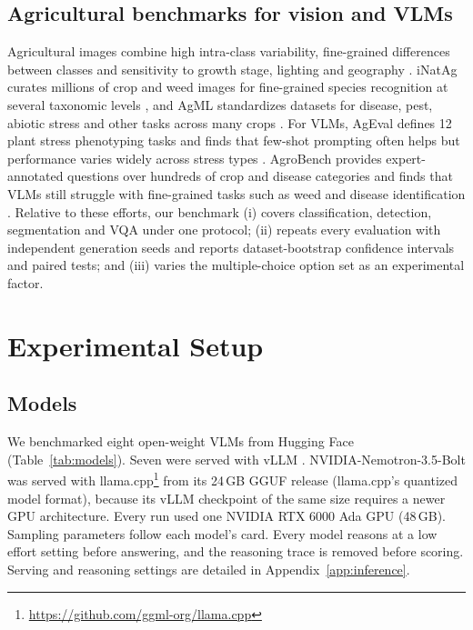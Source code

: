 \documentclass[10pt,letterpaper]{article}
\begin{document}
\subsection{Agricultural benchmarks for vision and VLMs}
\label{sec:background_ag_benchmarks}
Agricultural images combine high intra-class variability, fine-grained differences between classes and sensitivity to growth stage, lighting and geography \cite{min_computer_2025, upadhyay_deep_2025}. iNatAg curates millions of crop and weed images for fine-grained species recognition at several taxonomic levels \cite{jain_inatag_nodate}, and AgML standardizes datasets for disease, pest, abiotic stress and other tasks across many crops \cite{joshi_standardizing_2023}. For VLMs, AgEval defines 12 plant stress phenotyping tasks and finds that few-shot prompting often helps but performance varies widely across stress types \cite{arshad_leveraging_2025}. AgroBench provides expert-annotated questions over hundreds of crop and disease categories and finds that VLMs still struggle with fine-grained tasks such as weed and disease identification \cite{shinoda_agrobench_2025}. Relative to these efforts, our benchmark (i) covers classification, detection, segmentation and VQA under one protocol; (ii) repeats every evaluation with independent generation seeds and reports dataset-bootstrap confidence intervals and paired tests; and (iii) varies the multiple-choice option set as an experimental factor.

\section{Experimental Setup}
\label{sec:experiment}

\subsection{Models}
\label{sec:models}

We benchmarked eight open-weight VLMs from Hugging Face \cite{wolf_huggingfaces_2020} (Table~\ref{tab:models}). Seven were served with vLLM \cite{kwon2023efficient}. NVIDIA-Nemotron-3.5-Bolt was served with llama.cpp\footnote{\url{https://github.com/ggml-org/llama.cpp}} from its 24\,GB GGUF release (llama.cpp's quantized model format), because its vLLM checkpoint of the same size requires a newer GPU architecture. Every run used one NVIDIA RTX 6000 Ada GPU (48\,GB). Sampling parameters follow each model's card. Every model reasons at a low effort setting before answering, and the reasoning trace is removed before scoring. Serving and reasoning settings are detailed in Appendix~\ref{app:inference}.
\end{document}
